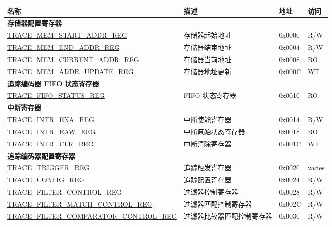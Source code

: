 \begin{longtable}{ | p{7.2cm} | p{6cm} | p{1.3cm} | p{1cm} | }
\hline\rowcolor{lightgray}
\textbf{名称} & \textbf{描述} &  \textbf{地址} & \textbf{访问} \\ \hline
\endhead
\multicolumn{4}{|l|}{\textbf{存储器配置寄存器}} \\ \hline
\hyperref[regdesc:TRACEMEMSTARTADDRREG]{TRACE\_MEM\_START\_ADDR\_REG} & 存储器起始地址 & 0x0000 & R/W \\ \hline
\hyperref[regdesc:TRACEMEMENDADDRREG]{TRACE\_MEM\_END\_ADDR\_REG} & 存储器结束地址 & 0x0004 & R/W \\ \hline
\hyperref[regdesc:TRACEMEMCURRENTADDRREG]{TRACE\_MEM\_CURRENT\_ADDR\_REG} & 存储器当前地址 & 0x0008 & RO \\ \hline
\hyperref[regdesc:TRACEMEMADDRUPDATEREG]{TRACE\_MEM\_ADDR\_UPDATE\_REG} & 存储器地址更新 & 0x000C & WT \\ \hline
\multicolumn{4}{|l|}{\textbf{追踪编码器 FIFO 状态寄存器}} \\ \hline
\hyperref[regdesc:TRACEFIFOSTATUSREG]{TRACE\_FIFO\_STATUS\_REG} & FIFO 状态寄存器 & 0x0010 & RO \\ \hline
\multicolumn{4}{|l|}{\textbf{中断寄存器}} \\ \hline
\hyperref[regdesc:TRACEINTRENAREG]{TRACE\_INTR\_ENA\_REG} & 中断使能寄存器 & 0x0014 & R/W \\ \hline
\hyperref[regdesc:TRACEINTRRAWREG]{TRACE\_INTR\_RAW\_REG} & 中断原始状态寄存器 & 0x0018 & RO \\ \hline
\hyperref[regdesc:TRACEINTRCLRREG]{TRACE\_INTR\_CLR\_REG} & 中断清除寄存器 & 0x001C & WT \\ \hline
\multicolumn{4}{|l|}{\textbf{追踪编码器配置寄存器}} \\ \hline
\hyperref[regdesc:TRACETRIGGERREG]{TRACE\_TRIGGER\_REG} & 追踪触发寄存器 & 0x0020 & varies \\ \hline
\hyperref[regdesc:TRACECONFIGREG]{TRACE\_CONFIG\_REG} & 追踪配置寄存器 & 0x0024 & R/W \\ \hline
\hyperref[regdesc:TRACEFILTERCONTROLREG]{TRACE\_FILTER\_CONTROL\_REG} & 过滤器控制寄存器 & 0x0028 & R/W \\ \hline
\hyperref[regdesc:TRACEFILTERMATCHCONTROLREG]{TRACE\_FILTER\_MATCH\_CONTROL\_REG} & 过滤器匹配控制寄存器 & 0x002C & R/W \\ \hline
\hyperref[regdesc:TRACEFILTERCOMPARATORCONTROLREG]{TRACE\_FILTER\_COMPARATOR\_CONTROL\_REG} & 过滤器比较器匹配控制寄存器 & 0x0030 & R/W \\ \hline

\end{longtable}
